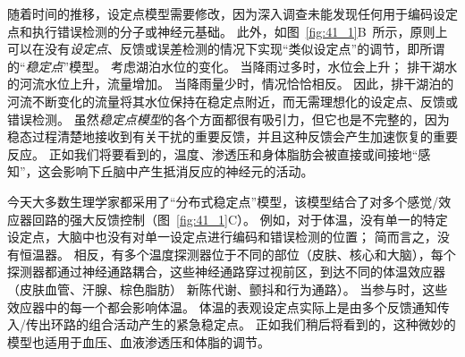 随着时间的推移，设定点模型需要修改，因为深入调查未能发现任何用于编码设定点和执行错误检测的分子或神经元基础。
此外，如图~\ref{fig:41_1}B~所示，原则上可以在没有\textit{设定点}、反馈或误差检测的情况下实现“类似设定点”的调节，即所谓的“\textit{稳定点}”模型。
考虑湖泊水位的变化。
当降雨过多时，水位会上升；
排干湖水的河流水位上升，流量增加。
当降雨量少时，情况恰恰相反。
因此，排干湖泊的河流不断变化的流量将其水位保持在稳定点附近，而无需理想化的设定点、反馈或错误检测。
虽然\textit{稳定点模型}的各个方面都很有吸引力，但它也是不完整的，因为稳态过程清楚地接收到有关干扰的重要反馈，并且这种反馈会产生加速恢复的重要反应。
正如我们将要看到的，温度、渗透压和身体脂肪会被直接或间接地“感知”，这会影响下丘脑中产生抵消反应的神经元的活动。


今天大多数生理学家都采用了“分布式稳定点”模型，该模型结合了对多个感觉/效应器回路的强大反馈控制（图~\ref{fig:41_1}C）。
例如，对于体温，没有单一的特定设定点，大脑中也没有对单一设定点进行编码和错误检测的位置；
简而言之，没有恒温器。
相反，有多个温度探测器位于不同的部位（皮肤、核心和大脑），每个探测器都通过神经通路耦合，这些神经通路穿过视前区，到达不同的体温效应器（皮肤血管、汗腺、棕色脂肪） 新陈代谢、颤抖和行为通路）。
当参与时，这些效应器中的每一个都会影响体温。
体温的表观设定点实际上是由多个反馈通知传入/传出环路的组合活动产生的紧急稳定点。
正如我们稍后将看到的，这种微妙的模型也适用于血压、血液渗透压和体脂的调节。


